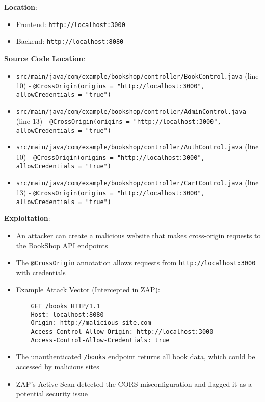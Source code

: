 \documentclass[]{UCD_CS_FYP_Report}
\begin{document}
\textbf{Location}: 
\begin{itemize}
    \item Frontend: \texttt{http://localhost:3000}
    \item Backend: \texttt{http://localhost:8080}
\end{itemize}

\textbf{Source Code Location}: 
\begin{itemize}
    \item \texttt{src/main/java/com/example/bookshop/controller/BookControl.java} (line 10) - \texttt{@CrossOrigin(origins = "http://localhost:3000", allowCredentials = "true")}
    \item \texttt{src/main/java/com/example/bookshop/controller/AdminControl.java} (line 13) - \texttt{@CrossOrigin(origins = "http://localhost:3000", allowCredentials = "true")}
    \item \texttt{src/main/java/com/example/bookshop/controller/AuthControl.java} (line 10) - \texttt{@CrossOrigin(origins = "http://localhost:3000", allowCredentials = "true")}
    \item \texttt{src/main/java/com/example/bookshop/controller/CartControl.java} (line 13) - \texttt{@CrossOrigin(origins = "http://localhost:3000", allowCredentials = "true")}
\end{itemize}

\textbf{Exploitation}:
\begin{itemize}
    \item An attacker can create a malicious website that makes cross-origin requests to the BookShop API endpoints
    \item The \texttt{@CrossOrigin} annotation allows requests from \texttt{http://localhost:3000} with credentials
    \item Example Attack Vector (Intercepted in ZAP):
    \begin{verbatim}
    GET /books HTTP/1.1
    Host: localhost:8080
    Origin: http://malicious-site.com
    Access-Control-Allow-Origin: http://localhost:3000
    Access-Control-Allow-Credentials: true
    \end{verbatim}
    \item The unauthenticated \texttt{/books} endpoint returns all book data, which could be accessed by malicious sites
    \item ZAP's Active Scan detected the CORS misconfiguration and flagged it as a potential security issue
\end{itemize}
\end{document}
